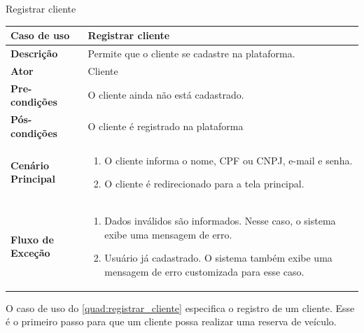 \begin{quadro}[H]
    \centering
    \caption{Registrar cliente}
    \label{quad:registrar_cliente}
    \begin{tabular}{|p{1.2in}|p{3.5in}|}
    \hline
    
    \textbf{Caso de uso} & Registrar cliente \\ \hline
    \textbf{Descrição} & Permite que o cliente se cadastre na plataforma. \\ \hline
    \textbf{Ator} & Cliente \\ \hline
    \textbf{Pre-condições} & O cliente ainda não está cadastrado. \\ \hline
    \textbf{Pós-condições} & O cliente é registrado na plataforma\\ \hline
    \textbf{Cenário Principal} & \begin{enumerate}
        \item O cliente informa o nome, CPF ou CNPJ, e-mail e senha.
        \item O cliente é redirecionado para a tela principal.
    \end{enumerate}  \\ \hline
    \textbf{Fluxo de Exceção} & \begin{enumerate}
        \item Dados inválidos são informados. Nesse caso, o sistema exibe uma mensagem de erro.
        \item Usuário já cadastrado. O sistema também exibe uma mensagem de erro customizada para esse caso.
    \end{enumerate}  \\ \hline
    \end{tabular}
\end{quadro}

O caso de uso do \autoref{quad:registrar_cliente} especifica o registro de um cliente. Esse é o primeiro passo para que um cliente possa realizar uma reserva de veículo.

